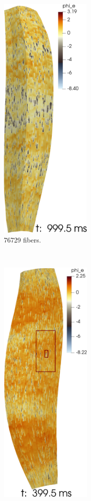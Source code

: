 \begin{figure}
  \begin{subfigure}{0.30\textwidth}%
    \centering%
    \includegraphics[height=125mm]{images/results/application/emg277.png}%
    \caption{\num{76729} fibers.}%
    \label{fig:emg277}%
  \end{subfigure}\,
  \begin{subfigure}{0.30\textwidth}%
    \centering%
    \includegraphics[height=125mm]{images/results/application/emg523.pdf}%

\end{subfigure}
\end{figure}
